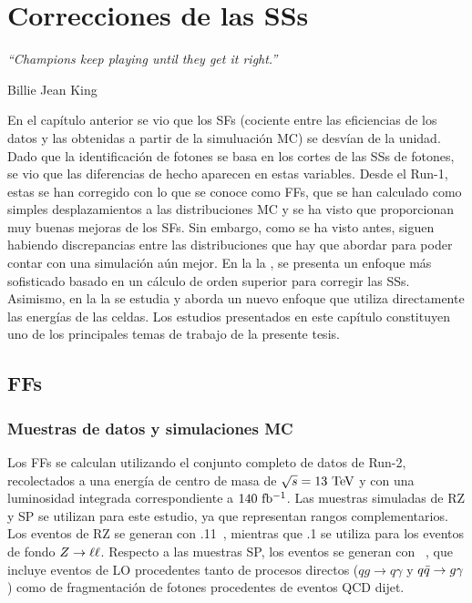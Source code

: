 \chapter{Correcciones de las \acfp{SS}}
\label{ch:ss_corrections}
\epigraph{\emph{“Champions keep playing until they get it right.”}}{Billie Jean King}


En el capítulo anterior se vio que los \acp{SF} (cociente entre las eficiencias de los datos y las obtenidas a partir de la simuluaci\'on \ac{MC}) se desvían de la unidad. Dado que la identificación de fotones se basa en los cortes de las \acp{SS} de fotones, se vio que las diferencias de hecho aparecen en estas variables. Desde el Run-1, estas se han corregido con lo que se conoce como \acfp{FF}, que se han calculado como simples desplazamientos a las distribuciones \ac{MC} y se ha visto que proporcionan muy buenas mejoras de los \acp{SF}. Sin embargo, como se ha visto antes, siguen habiendo discrepancias entre las distribuciones que hay que abordar para poder contar con una simulación aún mejor.
En la la \Sect{\ref{sec:ss_corrections:ffs}}, se presenta un enfoque más sofisticado basado en un cálculo de orden superior para corregir las \acp{SS}. Asimismo, en la la \Sect{\ref{sec:ss_corrections:cell_rw}} se estudia y aborda un nuevo enfoque que utiliza directamente las energías de las celdas. Los estudios presentados en este capítulo constituyen uno de los principales temas de trabajo de la presente tesis.





\section{\acfp{FF}}
\label{sec:ss_corrections:ffs}


\subsection{Muestras de datos y simulaciones \ac{MC}}
\label{subsec:ss_corrections:ffs:samples}

Los \acp{FF} se calculan utilizando el conjunto completo de datos de Run-2, recolectados a una energ\'ia de centro de masa de \(\sqrt{s}=13~\tev\) y con una luminosidad integrada correspondiente a \(140~\ifb\).
Las muestras simuladas de \ac{RZ} y \ac{SP} se utilizan para este estudio, ya que representan rangos \pt complementarios. Los eventos de \ac{RZ} se generan con .11~\cite{Sherpa2.2}, mientras que .1 se utiliza para los eventos de fondo \(\Zboson \to \ell\ell\). Respecto a las muestras \ac{SP}, los eventos se generan con ~\cite{Pythia8.1}, que incluye eventos \gammajet de \acf{LO} procedentes tanto de procesos directos (\(qg\to q\gamma\) y \(\qqbar \to g \gamma\)) como de fragmentación de fotones procedentes de eventos \ac{QCD} dijet.

